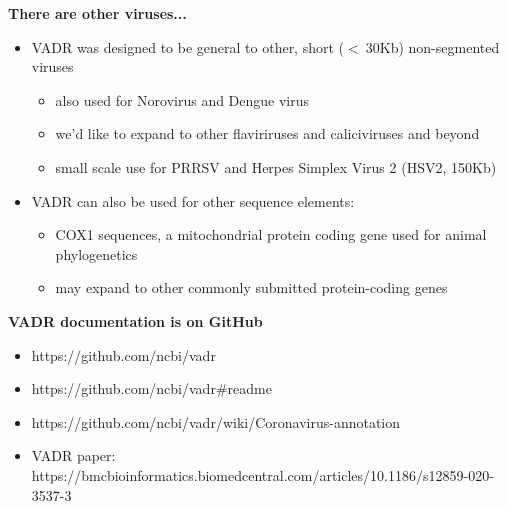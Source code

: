 \documentclass[landscape]{slides}
\begin{document}
\begin{slide}
\begin{center}
\large{\textbf{There are other viruses...}}

\normalsize
\begin{itemize}
\item VADR was designed to be general to other, short ($<~30$Kb)
  non-segmented viruses
  \begin{itemize}
  \item also used for Norovirus and Dengue virus
  \item we'd like to expand to other flaviriruses and caliciviruses
    and beyond
  \item small scale use for PRRSV and Herpes Simplex Virus 2 (HSV2,
    150Kb)
  \end{itemize}
\item VADR can also be used for other sequence elements:
  \begin{itemize}
    \item COX1 sequences, a mitochondrial protein coding gene used for
      animal phylogenetics
    \item may expand to other commonly submitted protein-coding genes
  \end{itemize}
\end{itemize}

\end{center}
\vfill
\end{slide}
\begin{slide}

\large
\begin{center}
\large{\textbf{VADR documentation is on GitHub}} \\

\normalsize
\vspace{0.75in}

\begin{itemize}
\item https://github.com/ncbi/vadr
\item https://github.com/ncbi/vadr\#readme
\item https://github.com/ncbi/vadr/wiki/Coronavirus-annotation
\item VADR paper: https://bmcbioinformatics.biomedcentral.com/articles/10.1186/s12859-020-3537-3
\end{itemize}

\end{center}
\vfill
\end{slide}
\end{document}
